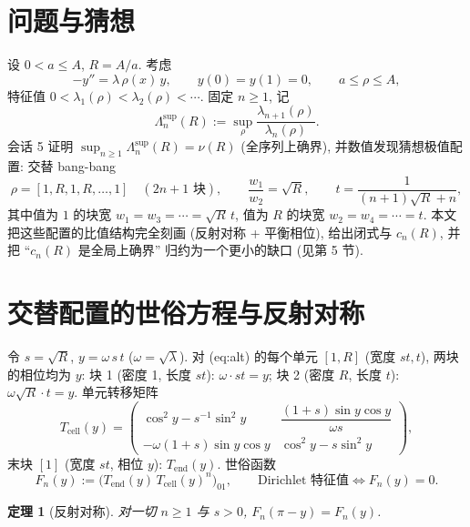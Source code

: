 \documentclass[UTF8]{ctexart}
\newtheorem{theorem}{定理}[section]
\begin{document}
\tableofcontents

\section{问题与猜想}

设 $0 < a \leq A$, $R = A/a$. 考虑
\begin{equation}
	-y'' = \lambda\,\rho(x)\,y, \qquad y(0) = y(1) = 0,
	\qquad a \leq \rho \leq A,
\end{equation}
特征值 $0 < \lambda_1(\rho) < \lambda_2(\rho) < \cdots$.
固定 $n \geq 1$, 记
\[
	\Lambda_n^{\sup}(R) := \sup_{\rho} \frac{\lambda_{n+1}(\rho)}{\lambda_n(\rho)}.
\]
会话 5 证明 $\sup_{n \geq 1}\Lambda_n^{\sup}(R) = \nu(R)$ (全序列上确界),
并数值发现猜想极值配置: 交替 bang-bang
\begin{equation}\label{eq:alt}
	\rho = [1, R, 1, R, \dots, 1] \quad (2n+1 \text{ 块}), \qquad
	\frac{w_1}{w_2} = \sqrt R,
	\qquad t = \frac{1}{(n+1)\sqrt R + n},
\end{equation}
其中值为 $1$ 的块宽 $w_1 = w_3 = \cdots = \sqrt R\,t$, 值为 $R$ 的块宽
$w_2 = w_4 = \cdots = t$.
本文把这些配置的比值结构完全刻画 (反射对称 + 平衡相位), 给出闭式与
$c_n(R)$, 并把 ``$c_n(R)$ 是全局上确界'' 归约为一个更小的缺口
(见第 5 节).

\section{交替配置的世俗方程与反射对称}

令 $s = \sqrt R$, $y = \omega\,s\,t$ ($\omega = \sqrt\lambda$).
对 (eq:alt) 的每个单元 $[1, R]$ (宽度 $st, t$), 两块的相位均为 $y$:
块 1 (密度 1, 长度 $st$): $\omega \cdot st = y$; 块 2 (密度 $R$, 长度
$t$): $\omega\sqrt R \cdot t = y$. 单元转移矩阵
\[
	T_{\mathrm{cell}}(y) =
	\begin{pmatrix}
		\cos^2 y - s^{-1}\sin^2 y & \dfrac{(1+s)\sin y\cos y}{\omega s}\\[2mm]
		-\omega(1+s)\sin y\cos y & \cos^2 y - s\sin^2 y
	\end{pmatrix},
\]
末块 $[1]$ (宽度 $st$, 相位 $y$): $T_{\mathrm{end}}(y)$. 世俗函数
\begin{equation}
	F_n(y) := \bigl(T_{\mathrm{end}}(y)\,T_{\mathrm{cell}}(y)^n\bigr)_{01},
	\qquad \text{Dirichlet 特征值} \iff F_n(y) = 0.
\end{equation}

\begin{theorem}[反射对称]\label{thm:sym}
	对一切 $n \geq 1$ 与 $s > 0$,
	$F_n(\pi - y) = F_n(y)$.
\end{theorem}
\end{document}
